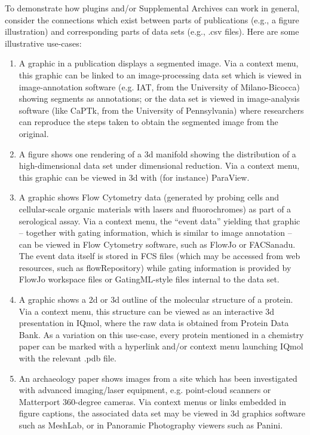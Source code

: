 \documentclass[11pt,letterpaper]{article}
\newcommand{\p}[1]{

\vspace{.7em}#1}
\newcommand{\q}[1]{{\fontfamily{qcr}\selectfont ``}#1{\fontfamily{qcr}\selectfont ''}}
\begin{document}
{\p{To demonstrate how plugins and/or Supplemental Archives can work in general, consider the connections which exist between parts of publications (e.g., a figure illustration) and corresponding parts of data sets (e.g., .csv files).  Here are some illustrative use-cases:

\begin{enumerate}
\item{}  A graphic in a publication displays a segmented image.  Via a context menu, this graphic can be linked to an image-processing data set which is viewed in image-annotation software (e.g. IAT, from the University of Milano-Bicocca) showing segments as annotations; or the data set is viewed in image-analysis software (like CaPTk, from the University of Pennsylvania) where researchers can reproduce the steps taken to obtain the segmented image from the original.

\item{}  A figure shows one rendering of a 3d manifold showing the distribution of a high-dimensional data set under dimensional reduction.  Via a context menu, this graphic can be viewed in 3d with (for instance) ParaView.

\item{}  A graphic shows Flow Cytometry data (generated by probing cells and cellular-scale organic materials with lasers and fluorochromes) as part of a serological assay.  Via a context menu, the \q{event data} yielding that graphic -- together with gating information, which is similar to image annotation -- can be viewed in Flow Cytometry software, such as FlowJo or FACSanadu.  The event data itself is stored in FCS files (which may be accessed from web resources, such as flowRepository) while gating information is provided by FlowJo workspace files or GatingML-style files internal to the data set.

\item{}  A graphic shows a 2d or 3d outline of the molecular structure of a protein.  Via a context menu, this structure can be viewed as an interactive 3d presentation in IQmol, where the raw data is obtained from Protein Data Bank.  As a variation on this use-case, every protein mentioned in a chemistry paper can be marked with a hyperlink and/or context menu launching IQmol with the relevant .pdb file.

\item{}  An archaeology paper shows images from a site which has been investigated with advanced imaging/laser equipment, e.g. point-cloud scanners or Matterport 360-degree cameras.  Via context menus or links embedded in figure captions, the associated data set may be viewed in 3d graphics software such as MeshLab, or in Panoramic Photography viewers such as Panini.


\end{enumerate}}}
\end{document}

